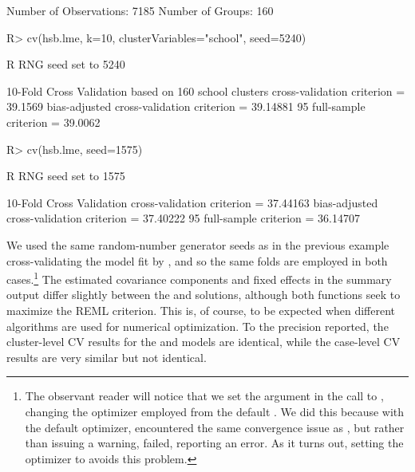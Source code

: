 \documentclass[
]{jss}
\begin{document}
\begin{CodeChunk}
\begin{CodeOutput}
Number of Observations: 7185
Number of Groups: 160 
\end{CodeOutput}
\begin{CodeInput}
R> cv(hsb.lme, k=10, clusterVariables="school", seed=5240)
\end{CodeInput}
\begin{CodeOutput}
R RNG seed set to 5240
\end{CodeOutput}
\begin{CodeOutput}
10-Fold Cross Validation based on 160 {school} clusters
cross-validation criterion = 39.1569
bias-adjusted cross-validation criterion = 39.14881
95%
full-sample criterion = 39.0062 
\end{CodeOutput}
\begin{CodeInput}
R> cv(hsb.lme, seed=1575)
\end{CodeInput}
\begin{CodeOutput}
R RNG seed set to 1575
\end{CodeOutput}
\begin{CodeOutput}
10-Fold Cross Validation
cross-validation criterion = 37.44163
bias-adjusted cross-validation criterion = 37.40222
95%
full-sample criterion = 36.14707 
\end{CodeOutput}
\end{CodeChunk}

We used the same random-number generator seeds as in the previous
example cross-validating the model fit by , and so the same
folds are employed in both cases.\footnote{The observant reader will
  notice that we set the argument  in
  the call to , changing the optimizer employed from the
  default . We did this because with the default
  optimizer,  encountered the same convergence issue as
  , but rather than issuing a warning,  failed,
  reporting an error. As it turns out, setting the optimizer to
   avoids this problem.} The estimated covariance
components and fixed effects in the summary output differ slightly
between the  and  solutions, although both
functions seek to maximize the REML criterion. This is, of course, to be
expected when different algorithms are used for numerical optimization.
To the precision reported, the cluster-level CV results for the
 and  models are identical, while the
case-level CV results are very similar but not identical.
\end{document}
